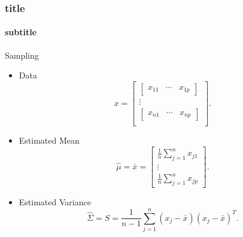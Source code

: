 \documentclass[aspectratio=169,10pt,t]{beamer}
\begin{document}
\begin{frame}[t]
	\frametitle{title}
	\framesubtitle{subtitle}
	Sampling
	\begin{itemize}
		\item Data
			\[
				x = 
				\begin{bmatrix}
					\begin{bmatrix}
					x_{11} & \cdots & x_{1p}
					\end{bmatrix}\\
					\vdots\\
					\begin{bmatrix}
					x_{n1} & \cdots & x_{np}
					\end{bmatrix}\\
				\end{bmatrix}
			.\] 
		\item Estimated Mean
			\[
			\hat{\mu} = \bar{x} = 
			\begin{bmatrix}
				\frac{1}{n} \sum^{n}_{j=1} x_{j1}\\
				\vdots\\
				\frac{1}{n} \sum^{n}_{j=1} x_{jp}
			\end{bmatrix}
			.\] 
		\item Estimated Variance
			\[
			\hat{\Sigma} = S = 
			\frac{1}{n-1} \sum^{n}_{j=1} 
			\left( x_j - \bar{x}  \right) 
			\left( x_j - \bar{x}  \right) ^{T}
			.\] 
	\end{itemize}
\end{frame}

\begin{frame}[t]




\end{frame}
\end{document}
